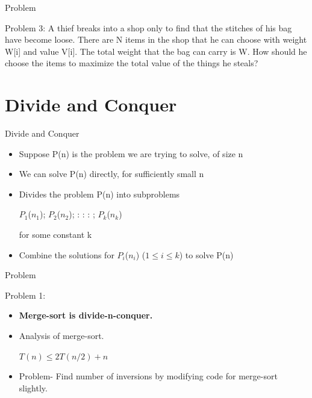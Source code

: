 \documentclass{beamer}
\begin{document}
\begin{frame}{Problem}
  \begin{block}{Problem 3:}
  A thief breaks into a shop only to find that the stitches of his bag have become loose. There are N items in the shop that he can choose with weight W[i] and value V[i]. The total weight that the bag can carry is W. How should he choose the items to maximize the total value of the things he steals?
  \end{block}
\end{frame}

\section{Divide and Conquer}
\begin{frame}[<+->]{Divide and Conquer}
  \begin{block}{}
  \begin{itemize}
  \item Suppose P(n) is the problem we are trying to solve, of size n\\
  \item We can solve P(n) directly, for sufficiently small n\\
  \item Divides the problem P(n) into subproblems\\
  \begin{center}$P_1$($n_1$); $P_2$($n_2$); : : : ; $P_k$($n_k$)\end{center} for some constant k
  \item Combine the solutions for $P_i$($n_i$) ($1 \leq i \leq k$) to solve P(n)
  \end{itemize}
  \end{block}
\end{frame}

\begin{frame}{Problem}
  \begin{block}{Problem 1:}
  \begin{itemize}
  \item {\bf Merge-sort is divide-n-conquer.}
  \item Analysis of merge-sort.
  \begin{center}$T(n) \leq 2T(n/2) + n$\end{center}
  \item Problem- Find number of inversions by modifying code for merge-sort slightly.
  \end{itemize}
  \end{block}
\end{frame}
\end{document}
